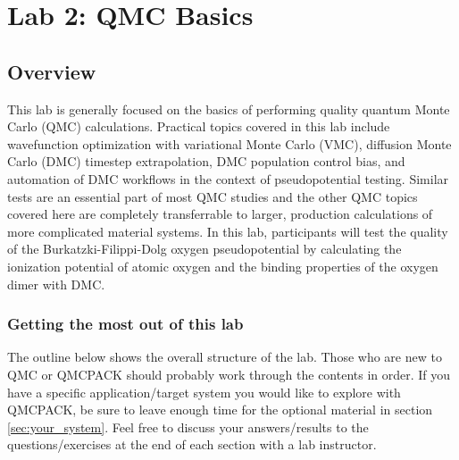 \chapter{Lab 2: QMC Basics}
\label{chap:lab_qmc_basics}



\section{Overview}
This lab is generally focused on the basics of performing quality quantum Monte 
Carlo (QMC) calculations.  Practical topics covered in this lab include 
wavefunction optimization with variational Monte Carlo (VMC), diffusion Monte 
Carlo (DMC) timestep extrapolation, DMC population control bias, and automation 
of DMC workflows in the context of pseudopotential testing.  Similar tests are 
an essential part of most QMC studies and the other QMC topics covered here are 
completely transferrable to larger, production calculations of more complicated 
material systems.  In this lab, participants will test the quality of the 
Burkatzki-Filippi-Dolg oxygen pseudopotential by calculating the ionization 
potential of atomic oxygen and the binding properties of the oxygen dimer with 
DMC.

\subsection{Getting the most out of this lab}
The outline below shows the overall structure of the lab.  Those who are new to QMC or QMCPACK should probably work through the contents in order.  If you have a specific application/target system you would like to explore with QMCPACK, be sure to leave enough time for the optional material in section \ref{sec:your_system}.  Feel free to discuss your answers/results to the questions/exercises at the end of each section with a lab instructor.

